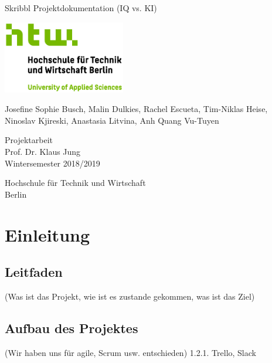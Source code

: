 \documentclass[11pt]{article}
\begin{document}
\begin{titlepage}
   \begin{center}
       \vspace*{1cm}

       \Huge
       Skribbl Projektdokumentation (IQ vs. KI)
       \vspace{2.0cm}

       \includegraphics[width=0.4\textwidth]{logo.jpg}

       \vspace{1.5cm}
       \LARGE

       Josefine Sophie Busch, Malin Dulkies, Rachel Escueta, Tim-Niklas Heise, Ninoslav Kjireski, Anastasia Litvina, Anh Quang Vu-Tuyen

       \vfill

       Projektarbeit \\
       Prof. Dr. Klaus Jung\\
       Wintersemester 2018/2019\\

       \vspace{0.8cm}

       Hochschule für Technik und Wirtschaft\\
       Berlin\\

   \end{center}
\end{titlepage}

\pagebreak
\tableofcontents
\pagebreak
\listoftables
\listoffigures
\pagebreak

\section{Einleitung}
\subsection{Leitfaden}
 (Was ist das Projekt, wie ist es zustande gekommen, was ist das Ziel)
\subsection{Aufbau des Projektes}
    (Wir haben uns für agile, Scrum usw. entschieden)    1.2.1. Trello, Slack
\end{document}
